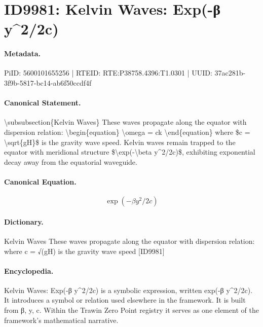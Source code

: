 \section*{ID9981: Kelvin Waves: Exp(-β y\textasciicircum{}2/2c)}
\paragraph{Metadata.}
PiID: 5600101655256 | RTEID: RTE:P38758.4396:T1.0301 | UUID: 37ac281b-3f9b-5817-bc14-ab6f50ccdf4f

\paragraph{Canonical Statement.}
\textbackslash{}subsubsection\{Kelvin Waves\} These waves propagate along the equator with dispersion relation: \textbackslash{}begin\{equation\} \textbackslash{}omega = ck \textbackslash{}end\{equation\} where \$c = \textbackslash{}sqrt\{gH\}\$ is the gravity wave speed. Kelvin waves remain trapped to the equator with meridional structure \$\textbackslash{}exp(-\textbackslash{}beta y\textasciicircum{}2/2c)\$, exhibiting exponential decay away from the equatorial waveguide.

\paragraph{Canonical Equation.}
\[
\exp(-\beta y^2/2c)
\]

\paragraph{Dictionary.}
Kelvin Waves These waves propagate along the equator with dispersion relation: where c = √(gH) is the gravity wave speed [ID9981]

\paragraph{Encyclopedia.}
Kelvin Waves: Exp(-β y\textasciicircum{}2/2c) is a symbolic expression, written exp(-β y\textasciicircum{}2/2c). It introduces a symbol or relation used elsewhere in the framework. It is built from β, y, c. Within the Trawin Zero Point registry it serves as one element of the framework's mathematical narrative.
